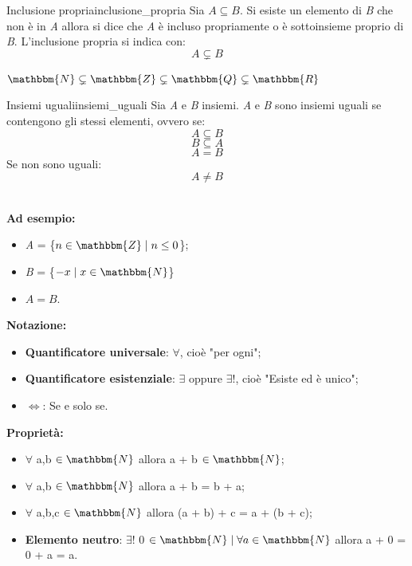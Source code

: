 \documentclass[12pt, letterpaper]{report}
\newcounter{definition}
\newcommand{\nmu}{}
\begin{document}
	\begin{definition}{\nmu Inclusione propria}{inclusione_propria}
		Sia $A \subseteq B$. Si esiste un elemento di \textit{B} che non è in \textit{A} allora si dice che \textit{A} è incluso propriamente o è sottoinsieme proprio di \textit{B}.
		L'inclusione propria si indica con:
		\[
			A \subsetneq B
		\]
	\end{definition}
	\begin{note}{}{}
	\begin{center}
	$\mathbbm{N} \subsetneq \mathbbm{Z} \subsetneq \mathbbm{Q} \subsetneq \mathbbm{R}$
\end{center}

	\end{note}
	\begin{definition}{\nmu Insiemi uguali}{insiemi_uguali}
		Sia \textit{A} e \textit{B} insiemi. \textit{A} e \textit{B} sono insiemi uguali se contengono gli stessi elementi, ovvero se:
		\[
		A \subseteq B
		\]
		\[
		B \subseteq A
		\]
		\[
		A = B
		\]
		Se non sono uguali:
		\[
			A \neq B
		\]
	\end{definition}
	\noindent
	\\
	\textbf{Ad esempio: }
	\begin{itemize}
		\item \textit{A} = \{$n \in \mathbbm{Z} \mid n \leq 0$\};
		\item \textit{B} = \{$-x \mid x \in \mathbbm{N}$\}
		\item $A = B$.
	\end{itemize}
	\textbf{Notazione: }
	\begin{itemize}
		\item \textbf{Quantificatore universale}: $\forall$, cioè "per ogni";
		\item \textbf{Quantificatore esistenziale}: $\exists$ oppure $\exists!$, cioè "Esiste ed è unico";
		\item $\iff$: Se e solo se.
	\end{itemize}
	\textbf{Proprietà: }
	\begin{itemize}
		\item $\forall$ a,b $\in \mathbbm{N}$ allora a + b $\in \mathbbm{N}$;
		\item $\forall$ a,b $\in \mathbbm{N}$ allora a + b = b + a;
		\item $\forall$ a,b,c $\in \mathbbm{N}$ allora (a + b) + c = a + (b + c);
		\item \textbf{Elemento neutro}: $\exists!$ 0 $\in \mathbbm{N} \mid \forall a \in \mathbbm{N}$ allora a + 0 = 0 + a = a.
	\end{itemize}
\end{document}
